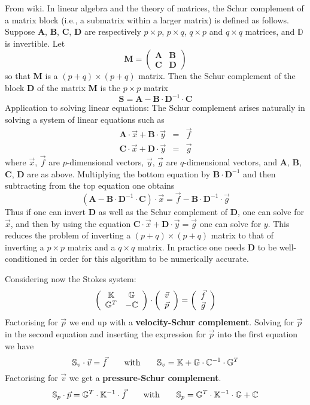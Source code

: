 From wiki.
In linear algebra and the theory of matrices, the Schur complement of a matrix block (i.e., a submatrix within a larger matrix) is defined as follows.
Suppose ${\bm A}$, ${\bm B}$, ${\bm C}$, ${\bm D}$
are respectively $p\times p$, $p \times q$, $q \times p$ and $q \times q$ matrices, and $\mathbb{D}$ is invertible. Let
\[
{\bm M}=
\left( \begin{array}{cc}
{\bm A} & {\bm B}  \\ 
{\bm C} & {\bm D}
\end{array} \right) 
\]
so that ${\bm M}$ is a $(p+q)\times(p+q)$ matrix.
Then the Schur complement of the block ${\bm D}$ of the matrix ${\bm M}$ is the $p \times p$ matrix
\[
{\bm S}={\bm A}-{\bm B}\cdot {\bm D}^{-1}\cdot {\bm C}
\]
Application to solving linear equations: The Schur complement arises naturally 
in solving a system of linear equations such as
\begin{eqnarray}
{\bm A}\cdot\vec x+{\bm B}\cdot \vec y &=& \vec f \nonumber\\
{\bm C}\cdot\vec x+{\bm D}\cdot \vec y &=& \vec g \nonumber
\end{eqnarray}
where $\vec x$, $\vec f$ are $p$-dimensional vectors, $\vec y$, $\vec g$
are $q$-dimensional vectors,
and ${\bm A}$, ${\bm B}$, ${\bm C}$, ${\bm D}$ are as above.
Multiplying the bottom equation by ${\bm B}\cdot {\bm D}^{-1}$ 
and then subtracting from the top equation one obtains
\[
({\bm A}-{\bm B}\cdot {\bm D}^{-1}\cdot {\bm C})\cdot \vec x = \vec f - {\bm B}\cdot {\bm D}^{-1}\cdot \vec g
\]
Thus if one can invert ${\bm D}$ as well as the Schur complement of ${\bm D}$, one can solve for $\vec x$,
and then by using the equation $\bm C\cdot \vec x + \bm D \cdot \vec y = \vec g$ one can solve for $y$.
This reduces the problem of inverting a $(p+q) \times (p+q)$ matrix to that of inverting
a $p \times p$ matrix and a $q \times q$ matrix.
In practice one needs ${\bm D}$ to be well-conditioned in order for 
this algorithm to be numerically accurate.

Considering now the Stokes system: 
\[
\left( \begin{array}{cc}
{\mathbb{K}} & {\mathbb{G}}  \\ {\mathbb{G}}^T &  -{\mathbb{C}}
\end{array} \right) \cdot
\left( \begin{array}{c}  {\vec v} \\ {\vec p}  \end{array} \right) = 
\left( \begin{array}{c}  {\vec f} \\ {\vec g}  \end{array} \right) 
\]
Factorising for ${\vec p}$ we end up with a {\bf velocity-Schur complement}.
Solving for ${\vec p}$ in the second equation and inserting the expression
for ${\vec p}$ into the first equation we have
\[
\mathbb{S}_v \cdot {\vec v}  = {\vec f} 
\quad\quad
\text{with}
\quad\quad
\mathbb{S}_v={\mathbb{K}}+ {\mathbb{G}} \cdot {\mathbb{C}}^{-1} \cdot {\mathbb{G}}^T
\]
Factorising for $\vec v$ we get a {\bf pressure-Schur complement}.
\[
\mathbb{S}_p \cdot {\vec p}  = {\mathbb{G}}^T \cdot {\mathbb{K}}^{-1}\cdot {\vec f}
\quad\quad
\text{with}
\quad\quad
\mathbb{S}_p = {\mathbb{G}}^T \cdot {\mathbb{K}}^{-1}\cdot {\mathbb{G}} + {\mathbb{C}} 
\]


